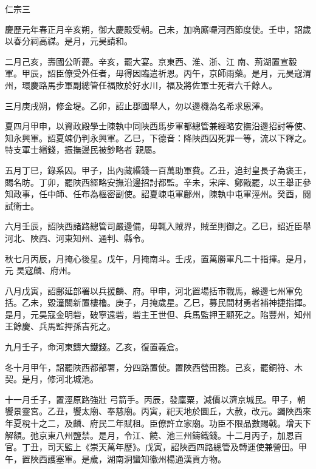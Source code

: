 
\begin{pinyinscope}

 仁宗三



 慶歷元年春正月辛亥朔，御大慶殿受朝。己未，加唃廝囉河西節度使。壬申，詔歲以春分祠高禖。是月，元昊請和。



 二月己亥，壽國公昕薨。辛亥，罷大宴。京東西、淮、浙、江
 南、荊湖置宣毅軍。甲辰，詔臣僚受外任者，毋得因臨遣祈恩。丙午，京師雨藥。是月，元昊寇渭州，環慶路馬步軍副總管任福敗於好水川，福及將佐軍士死者六千餘人。



 三月庚戌朔，修金堤。乙卯，詔止郡國舉人，勿以邊機為名希求恩澤。



 夏四月甲申，以資政殿學士陳執中同陜西馬步軍都總管兼經略安撫沿邊招討等使、知永興軍。詔夏竦仍判永興軍。乙巳，下德音：降陜西囚死罪一等，流以下釋之。特支軍士緡錢，振撫邊民被鈔略者
 親屬。



 五月丁巳，錄系囚。甲子，出內藏緡錢一百萬助軍費。乙丑，追封皇長子為褒王，賜名昉。丁卯，罷陜西經略安撫沿邊招討都監。辛未，宋庠、鄭戩罷，以王舉正參知政事，任中師、任布為樞密副使。詔夏竦屯軍鄜州，陳執中屯軍涇州。癸酉，閱試衛士。



 六月壬辰，詔陜西諸路總管司嚴邊備，毋輒入賊界，賊至則御之。乙巳，詔近臣舉河北、陜西、河東知州、通判、縣令。



 秋七月丙辰，月掩心後星。戊午，月掩南斗。壬戌，置萬勝軍凡二十指揮。是月，元
 昊寇麟、府州。



 八月戊寅，詔鄜延部署以兵援麟、府。甲申，河北置場括市戰馬，緣邊七州軍免括。乙未，毀潼關新置樓櫓。庚子，月掩歲星。乙巳，募民間材勇者補神捷指揮。是月，元昊寇金明砦，破寧遠砦，砦主王世但、兵馬監押王顯死之。陷豐州，知州王餘慶、兵馬監押孫吉死之。



 九月壬子，命河東鑄大鐵錢。乙亥，復置義倉。



 冬十月甲午，詔罷陜西都部署，分四路置使。置陜西營田務。己亥，罷銅符、木契。是月，修河北城池。



 十一月壬子，置涇原路強壯
 弓箭手。丙辰，發廩粟，減價以濟京城民。甲子，朝饗景靈宮。乙丑，饗太廟、奉慈廟。丙寅，祀天地於圜丘，大赦，改元。蠲陜西來年夏稅十之二，及麟、府民二年賦租。臣僚許立家廟。功臣不限品數賜戟。增天下解額。弛京東八州鹽禁。是月，令江、饒、池三州鑄鐵錢。十二月丙子，加恩百官。丁丑，司天監上《崇天萬年歷》。戊寅，詔陜西四路總管及轉運使兼營田。甲午，置陜西護塞軍。是歲，湖南洞蠻知徽州楊通漢貢方物。




\end{pinyinscope}
